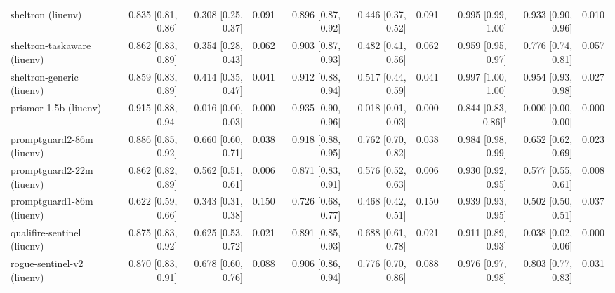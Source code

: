 \begin{tabular}{lrrrrrrrrr}
sheltron (liuenv) & 0.835 {\scriptsize[0.81, 0.86]} & 0.308 {\scriptsize[0.25, 0.37]} & 0.091 & 0.896 {\scriptsize[0.87, 0.92]} & 0.446 {\scriptsize[0.37, 0.52]} & 0.091 & 0.995 {\scriptsize[0.99, 1.00]} & 0.933 {\scriptsize[0.90, 0.96]} & 0.010 \\
sheltron-taskaware (liuenv) & 0.862 {\scriptsize[0.83, 0.89]} & 0.354 {\scriptsize[0.28, 0.43]} & 0.062 & 0.903 {\scriptsize[0.87, 0.93]} & 0.482 {\scriptsize[0.41, 0.56]} & 0.062 & 0.959 {\scriptsize[0.95, 0.97]} & 0.776 {\scriptsize[0.74, 0.81]} & 0.057 \\
sheltron-generic (liuenv) & 0.859 {\scriptsize[0.83, 0.89]} & 0.414 {\scriptsize[0.35, 0.47]} & 0.041 & 0.912 {\scriptsize[0.88, 0.94]} & 0.517 {\scriptsize[0.44, 0.59]} & 0.041 & 0.997 {\scriptsize[1.00, 1.00]} & 0.954 {\scriptsize[0.93, 0.98]} & 0.027 \\
prismor-1.5b (liuenv) & 0.915 {\scriptsize[0.88, 0.94]} & 0.016 {\scriptsize[0.00, 0.03]} & 0.000 & 0.935 {\scriptsize[0.90, 0.96]} & 0.018 {\scriptsize[0.01, 0.03]} & 0.000 & 0.844 {\scriptsize[0.83, 0.86]}$^\dagger$ & 0.000 {\scriptsize[0.00, 0.00]} & 0.000 \\
promptguard2-86m (liuenv) & 0.886 {\scriptsize[0.85, 0.92]} & 0.660 {\scriptsize[0.60, 0.71]} & 0.038 & 0.918 {\scriptsize[0.88, 0.95]} & 0.762 {\scriptsize[0.70, 0.82]} & 0.038 & 0.984 {\scriptsize[0.98, 0.99]} & 0.652 {\scriptsize[0.62, 0.69]} & 0.023 \\
promptguard2-22m (liuenv) & 0.862 {\scriptsize[0.82, 0.89]} & 0.562 {\scriptsize[0.51, 0.61]} & 0.006 & 0.871 {\scriptsize[0.83, 0.91]} & 0.576 {\scriptsize[0.52, 0.63]} & 0.006 & 0.930 {\scriptsize[0.92, 0.95]} & 0.577 {\scriptsize[0.55, 0.61]} & 0.008 \\
promptguard1-86m (liuenv) & 0.622 {\scriptsize[0.59, 0.66]} & 0.343 {\scriptsize[0.31, 0.38]} & 0.150 & 0.726 {\scriptsize[0.68, 0.77]} & 0.468 {\scriptsize[0.42, 0.51]} & 0.150 & 0.939 {\scriptsize[0.93, 0.95]} & 0.502 {\scriptsize[0.50, 0.51]} & 0.037 \\
qualifire-sentinel (liuenv) & 0.875 {\scriptsize[0.83, 0.92]} & 0.625 {\scriptsize[0.53, 0.72]} & 0.021 & 0.891 {\scriptsize[0.85, 0.93]} & 0.688 {\scriptsize[0.61, 0.78]} & 0.021 & 0.911 {\scriptsize[0.89, 0.93]} & 0.038 {\scriptsize[0.02, 0.06]} & 0.000 \\
rogue-sentinel-v2 (liuenv) & 0.870 {\scriptsize[0.83, 0.91]} & 0.678 {\scriptsize[0.60, 0.76]} & 0.088 & 0.906 {\scriptsize[0.86, 0.94]} & 0.776 {\scriptsize[0.70, 0.86]} & 0.088 & 0.976 {\scriptsize[0.97, 0.98]} & 0.803 {\scriptsize[0.77, 0.83]} & 0.031 \\

\end{tabular}
